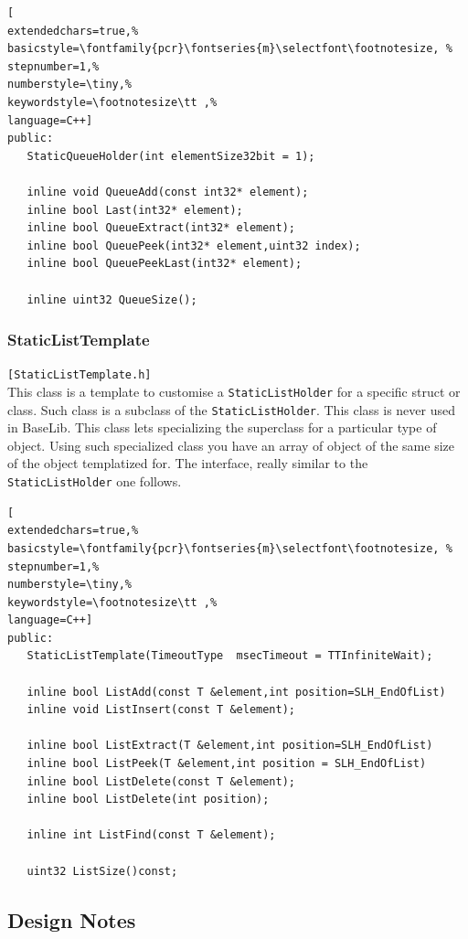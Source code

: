 \begin{lstlisting}[
extendedchars=true,%
basicstyle=\fontfamily{pcr}\fontseries{m}\selectfont\footnotesize, %
stepnumber=1,%
numberstyle=\tiny,%
keywordstyle=\footnotesize\tt ,%
language=C++]
public:
   StaticQueueHolder(int elementSize32bit = 1);

   inline void QueueAdd(const int32* element);
   inline bool Last(int32* element);
   inline bool QueueExtract(int32* element);
   inline bool QueuePeek(int32* element,uint32 index);
   inline bool QueuePeekLast(int32* element);

   inline uint32 QueueSize();
\end{lstlisting}



\subsubsection{StaticListTemplate}
\texttt{[StaticListTemplate.h]}\\
This class is a template to customise a \texttt{StaticListHolder} for a specific struct or class. Such class is a subclass of the \texttt{StaticListHolder}. This class is never used in BaseLib. This class lets specializing the superclass for a particular type of object. Using such specialized class you have an array of object of the same size of the object templatized for. The interface, really similar to the \texttt{StaticListHolder} one follows.

\begin{lstlisting}[
extendedchars=true,%
basicstyle=\fontfamily{pcr}\fontseries{m}\selectfont\footnotesize, %
stepnumber=1,%
numberstyle=\tiny,%
keywordstyle=\footnotesize\tt ,%
language=C++]
public:
   StaticListTemplate(TimeoutType  msecTimeout = TTInfiniteWait);

   inline bool ListAdd(const T &element,int position=SLH_EndOfList)
   inline void ListInsert(const T &element);

   inline bool ListExtract(T &element,int position=SLH_EndOfList)
   inline bool ListPeek(T &element,int position = SLH_EndOfList)
   inline bool ListDelete(const T &element);
   inline bool ListDelete(int position);

   inline int ListFind(const T &element);

   uint32 ListSize()const;
\end{lstlisting}



\subsection{Design Notes}

